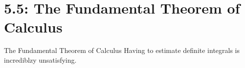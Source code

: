\documentclass[Lecture.tex]{subfiles}
\begin{document}
\section{5.5: The Fundamental Theorem of Calculus}

\begin{frame}{The Fundamental Theorem of Calculus}
  Having to estimate definite integrals is incrediblzy unsatisfying.
\end{frame}
\end{document}
